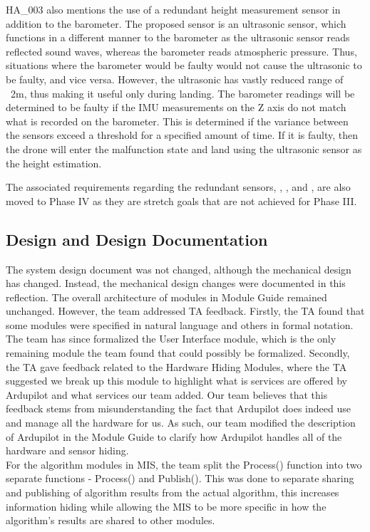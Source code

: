 \documentclass{article}
\begin{document}
HA\_003 also mentions the use of a redundant height measurement sensor in addition to the barometer. The proposed sensor is an ultrasonic sensor, which functions in a different manner to the barometer as the ultrasonic sensor reads reflected sound waves, whereas the barometer reads atmospheric pressure. Thus, situations where the barometer would be faulty would not cause the ultrasonic to be faulty, and vice versa. However, the ultrasonic has vastly reduced range of ~2m, thus making it useful only during landing. The barometer readings will be determined to be faulty if the IMU measurements on the Z axis do not match what is recorded on the barometer. This is determined if the variance between the sensors exceed a threshold for a specified amount of time. If it is faulty, then the drone will enter the malfunction state and land using the ultrasonic sensor as the height estimation. 

The associated requirements regarding the redundant sensors, , , and , are also moved to Phase IV as they are stretch goals that are not achieved for Phase III.


\subsection{Design and Design Documentation}
\indent The system design document was not changed, although the mechanical design has changed. Instead, the mechanical design changes were documented in this reflection. The overall architecture of modules in Module Guide remained unchanged. However, the team addressed TA feedback. Firstly, the TA found that some modules were specified in natural language and others in formal notation. The team has since formalized the User Interface module, which is the only remaining module the team found that could possibly be formalized. Secondly, the TA gave feedback related to the Hardware Hiding Modules, where the TA suggested we break up this module to highlight what is services are offered by Ardupilot and what services our team added. Our team believes that this feedback stems from misunderstanding the fact that Ardupilot does indeed use and manage all the hardware for us. As such, our team modified the description of Ardupilot in the Module Guide to clarify how Ardupilot handles all of the hardware and sensor hiding.
\\ \indent For the algorithm modules in MIS, the team split the Process() function into two separate functions - Process() and Publish(). This was done to separate sharing and publishing of algorithm results from the actual  algorithm, this increases information hiding while allowing the MIS to be more specific in how the algorithm's results are shared to other modules.
\end{document}

